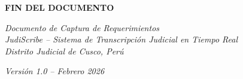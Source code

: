 \documentclass[12pt,a4paper]{report}
\begin{document}
\vspace{2cm}

\begin{center}
\textbf{\Large FIN DEL DOCUMENTO}

\vspace{1cm}

\textit{Documento de Captura de Requerimientos}\\
\textit{JudiScribe -- Sistema de Transcripción Judicial en Tiempo Real}\\
\textit{Distrito Judicial de Cusco, Perú}

\vspace{1cm}

\textit{Versión 1.0 -- Febrero 2026}
\end{center}
\end{document}
